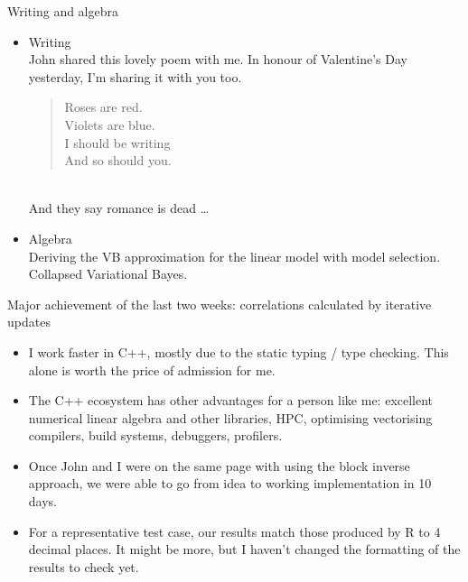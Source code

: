 \documentclass{beamer}
\begin{document}
\begin{frame}{Writing and algebra}
\begin{itemize}
\item Writing \\
John shared this lovely poem with me. In honour of Valentine's Day yesterday, I'm sharing it with you too.
\begin{quote}
Roses are red. \\
Violets are blue. \\
I should be writing \\
And so should you. \\
\end{quote} \\
And they say romance is dead \ldots
\item Algebra \\
Deriving the VB approximation for the linear model with model selection. \\
Collapsed Variational Bayes.
\end{itemize}
\end{frame}

\begin{frame}{Major achievement of the last two weeks: correlations calculated by iterative updates}
\begin{itemize}
\item I work faster in C++, mostly due to the static typing / type checking. This alone is worth the price of 
			admission for me.
\item The C++ ecosystem has other advantages for a person like me: excellent numerical linear algebra 
			and other libraries, HPC, optimising vectorising compilers, build systems, debuggers, profilers.
\item Once John and I were on the same page with using the block inverse approach, we were able to go from 
			idea to working implementation in 10 days.
\item For a representative test case, our results match those produced by R to 4 decimal places. It might be 
			more, but I haven't changed the formatting of the results to check yet.
\end{itemize}
\end{frame}
\end{document}

